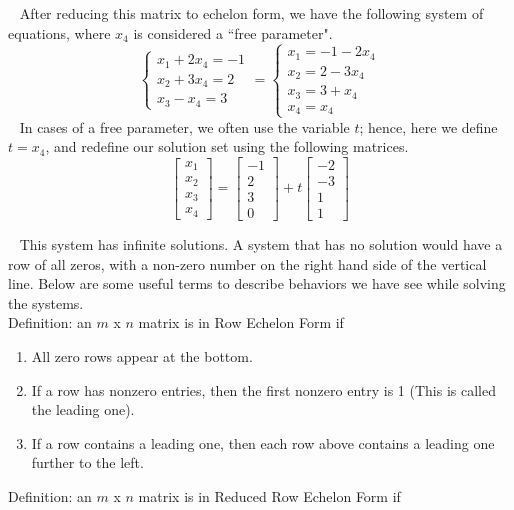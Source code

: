 \documentclass[12pt]{article}
\begin{document}
$\,\,\,$ After reducing this matrix to echelon form, we have the following system of equations, where $x_4$ is considered a “free parameter".
$$\left\lbrace\begin{matrix}
x_1+2x_4=-1\\x_2+3x_4=2\\x_3-x_4=3
\end{matrix}\right.=\left\lbrace\begin{matrix}
x_1=-1-2x_4\\x_2=2-3x_4\\x_3=3+x_4\\x_4=x_4
\end{matrix}\right.$$
$\,\,\,$ In cases of a free parameter, we often use the variable $t$; hence, here we define $t=x_4$, and redefine our solution set using the following matrices.
$$\begin{bmatrix}
x_1\\x_2\\x_3\\x_4
\end{bmatrix}
=
\begin{bmatrix}
-1\\2\\3\\0
\end{bmatrix}
+t
\begin{bmatrix}
-2\\-3\\1\\1
\end{bmatrix}$$

$\,\,\,$ This system has infinite solutions. A system that has no solution would have a row of all zeros, with a non-zero number on the right hand side of the vertical line. Below are some useful terms to describe behaviors we have see while solving the systems.\\

Definition: an $m$ x $n$ matrix is in Row Echelon Form if

\begin{enumerate}
\item All zero rows appear at the bottom.
\item If a row has nonzero entries, then the first nonzero entry is 1 (This is called the leading one).
\item If a row contains a leading one, then each row above contains a leading one further to the left.
\end{enumerate}

Definition: an $m$ x $n$ matrix is in Reduced Row Echelon Form if
\end{document}
